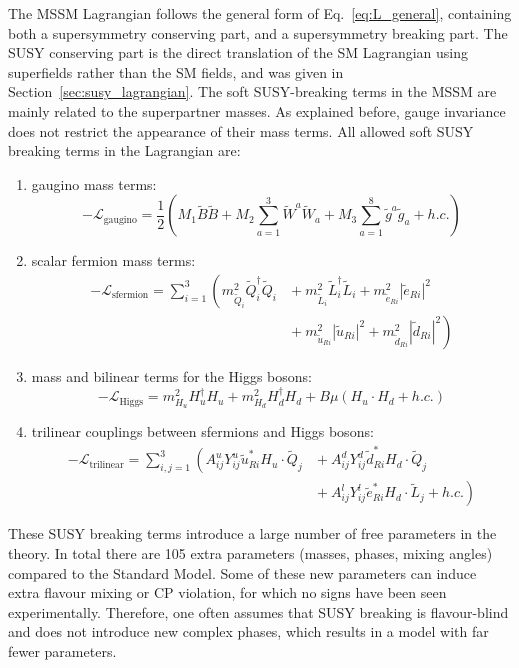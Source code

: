 The MSSM Lagrangian follows the general form of Eq.~\ref{eq:L_general}, containing both a
supersymmetry conserving part, and a supersymmetry breaking part. 
The SUSY conserving part is the direct translation of the SM Lagrangian using superfields rather
than the SM fields, and was given in Section~\ref{sec:susy_lagrangian}.  
The soft SUSY-breaking terms in the MSSM are mainly related to the superpartner masses. As
explained before, gauge invariance does not restrict the appearance of their mass terms. 
All allowed soft SUSY breaking terms in the Lagrangian are:
\begin{enumerate}
  \item gaugino mass terms: 
    \begin{equation}
      - \mathcal{L}_{\text{gaugino}} = \frac{1}{2} \left( M_1\widetilde{B}\widetilde{B} + M_2
\sum_{a=1}^3 \widetilde{W}^a\widetilde{W}_a + M_3 \sum_{a=1}^8 \widetilde{g}^a\widetilde{g}_a + h.c.
\right) \label{eq:gaugino_mass}
    \end{equation}
  \item scalar fermion mass terms:
    \begin{align}
      - \mathcal{L}_{\text{sfermion}} = \sum_{i=1}^3 \left( 
m_{\widetilde{Q}_i}^2\widetilde{Q}^\dagger_i\widetilde{Q}_i \right.
&{}+ m_{\widetilde{L}_i}^2\widetilde{L}^\dagger_i\widetilde{L}_i +
m_{\widetilde{e}_{Ri}}^2 \left|\widetilde{e}_{Ri}\right|^2  
 \nonumber \\
 &{}+ \left. m_{\widetilde{u}_{Ri}}^2\left|\widetilde{u}_{Ri}\right|^2 +
m_{\widetilde{d}_{Ri}}^2 \left|\widetilde{d}_{Ri}\right|^2
\right)
\end{align}
  \item mass and bilinear terms for the Higgs bosons:
    \begin{equation}
      - \mathcal{L}_{\text{Higgs}} = m^2_{H_u} H_u^\dagger H_u + m^2_{H_d} H_d^\dagger H_d + B\mu
(H_u \cdot H_d + h.c.)
      \label{eq:L_higgs}
    \end{equation}
  \item trilinear couplings between sfermions and Higgs bosons:
    \begin{align}
       - \mathcal{L}_{\text{trilinear}} = \sum_{i,j=1}^3 \left( A_{ij}^u Y_{ij}^u
\widetilde{u}_{Ri}^* H_u \cdot \widetilde{Q}_j \right. &{}+ A_{ij}^d Y_{ij}^d \widetilde{d}_{Ri}^*
H_d \cdot \widetilde{Q}_j \nonumber \\
&{}+ \left. A_{ij}^l Y_{ij}^l \widetilde{e}_{Ri}^* H_d \cdot \widetilde{L}_j + h.c. \right)
    \end{align}

\end{enumerate}
These SUSY breaking terms introduce a large number of free parameters in the theory. In total
there are 105 extra parameters (masses, phases, mixing angles) compared to the Standard Model. 
Some of these new parameters can induce extra flavour mixing or CP violation, for which no signs
have been seen experimentally. Therefore, one often assumes that SUSY breaking is flavour-blind
and does not introduce new complex phases, which results in a model with far fewer parameters. 

